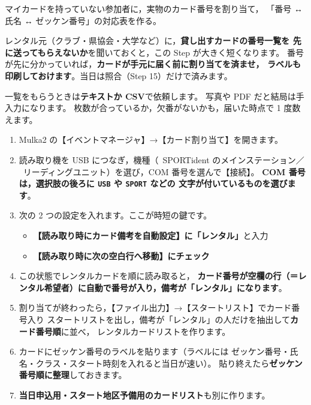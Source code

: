 
\begin{Goal}
マイカードを持っていない参加者に，実物のカード番号を割り当て，
「番号 ↔ 氏名 ↔ ゼッケン番号」の対応表を作る。
\end{Goal}

\begin{Note}[借りる前に番号を聞いておく]
レンタル元（クラブ・県協会・大学など）に，\textbf{貸し出すカードの番号一覧を
先に送ってもらえないか}を聞いておくと，この Step が大きく短くなります。
番号が先に分かっていれば，\textbf{カードが手元に届く前に割り当てを済ませ，
ラベルも印刷しておけます}。当日は照合（Step 15）だけで済みます。

一覧をもらうときは\textbf{テキストか CSV}で依頼します。
写真や PDF だと結局は手入力になります。
枚数が合っているか，欠番がないかも，届いた時点で 1 度数えます。
\end{Note}

\begin{enumerate}
\item Mulka2 の【イベントマネージャ】→【カード割り当て】を開きます。
\item 読み取り機を USB につなぎ，機種（\tSI\ SPORTident のメインステーション／
      \tEMIT\ リーディングユニット）を選び，COM 番号を選んで【接続】。
      \textbf{COM 番号は，選択肢の後ろに \texttt{USB} や \texttt{SPORT} などの
      文字が付いているものを選びます}。
\item 次の 2 つの設定を入れます。ここが時短の鍵です。
  \begin{itemize}
  \item \textbf{【読み取り時にカード備考を自動設定】に「レンタル」}と入力
  \item \textbf{【読み取り時に次の空白行へ移動】にチェック}
  \end{itemize}
\item この状態でレンタルカードを順に読み取ると，
      \textbf{カード番号が空欄の行（＝レンタル希望者）に自動で番号が入り，備考が「レンタル」になります}。
\item 割り当てが終わったら，【ファイル出力】→【スタートリスト】でカード番号入り
      スタートリストを出し，備考が「レンタル」の人だけを抽出して\textbf{カード番号順}に並べ，
      レンタルカードリストを作ります。
\item カードにゼッケン番号のラベルを貼ります（ラベルには
      ゼッケン番号・氏名・クラス・スタート時刻を入れると当日が速い）。
      貼り終えたら\textbf{ゼッケン番号順に整理}しておきます。
\item \textbf{当日申込用・スタート地区予備用のカードリスト}も別に作ります。
\end{enumerate}

